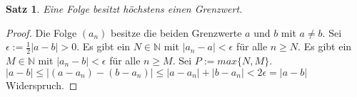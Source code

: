 \documentclass[a4paper,10pt]{article}
\newtheorem{satz}{Satz}
\begin{document}
\begin{satz}
 Eine Folge besitzt höchstens einen Grenzwert.
\end{satz}

\begin{proof}
 Die Folge $(a_n)$ besitze die beiden Grenzwerte $a$ und $b$ mit $a \ne b$.
 Sei $\epsilon := \frac{1}{2}|a - b| > 0$.
 Es gibt ein $N \in \mathbb{N}$ mit $|a_n - a| < \epsilon$ für alle $n \ge N$.
 Es gibt ein $M \in \mathbb{N}$ mit $|a_n - b| < \epsilon$ für alle $n \ge M$.
 Sei $P := max \{N, M\}$.
 $|a - b| \le |(a - a_n) - (b - a_n)| \le |a - a_n| + |b - a_n| < 2\epsilon = |a - b|$ Widerspruch.
\end{proof}
\end{document}
